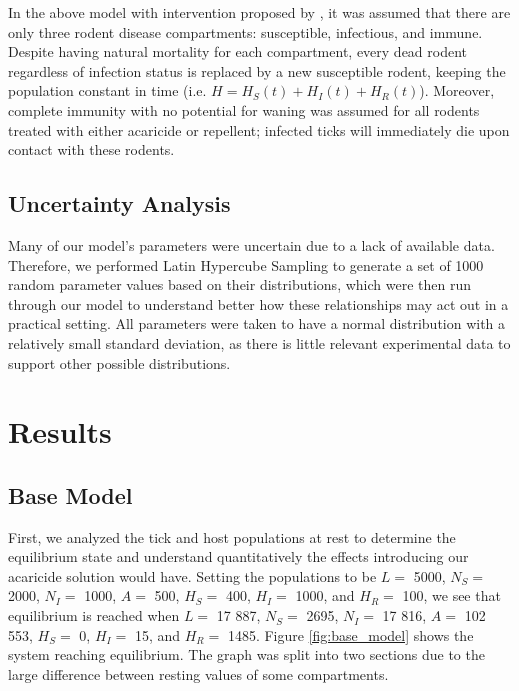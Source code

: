 \documentclass[12pt, centerh1]{article}
\newcommand{\geneva}[1]{{\textcolor{red}{$\langle$GL: #1$\rangle$}}}
\begin{document}
In the above model with intervention proposed by \cite{tosato2021host}, it was assumed that there are only three rodent disease compartments: susceptible, infectious, and immune. Despite having natural mortality for each compartment, every dead rodent regardless of infection status is replaced by a new susceptible rodent, keeping the population constant in time (i.e. $H = H_S(t) + H_I(t) + H_R(t)$). Moreover, complete immunity with no potential for waning was assumed for all rodents treated with either acaricide or repellent; infected ticks will immediately die upon contact with these rodents. %


\subsection{Uncertainty Analysis}
Many of our model's parameters were uncertain due to a lack of available data. Therefore, we performed Latin Hypercube Sampling to generate a set of 1000 random parameter values based on their distributions, which were then run through our model to understand better how these relationships may act out in a practical setting. All parameters were taken to have a normal distribution with a relatively small standard deviation, as there is little relevant experimental data to support other possible distributions. 


\section{Results}

\subsection{Base Model}
First, we analyzed the tick and host populations at rest to determine the equilibrium state and understand quantitatively the effects introducing our acaricide solution would have. Setting the populations to be $L=$ 5000, $N_S=$ 2000, $N_I=$ 1000, $A=$ 500, $H_S=$ 400, $H_I=$ 1000, and $H_R=$ 100, we see that equilibrium is reached when $L=$ 17 887, $N_S=$ 2695, $N_I=$ 17 816, $A=$ 102 553, $H_S=$ 0, $H_I=$ 15, and $H_R=$ 1485. Figure \ref{fig:base_model} shows the system reaching equilibrium. The graph was split into two sections due to the large difference between resting values of some compartments.
\end{document}
